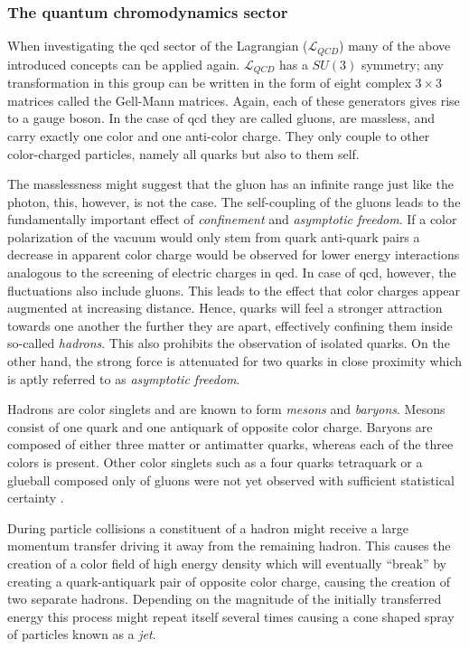 \subsubsection{The quantum chromodynamics sector}
\label{sec:qcd}

When investigating the \gls{qcd} sector of the Lagrangian ($\mathcal{L}_{QCD}$) many of the above introduced concepts can be applied again. $\mathcal{L}_{QCD}$ has a $SU(3)$ symmetry; any transformation in this group can be written in the form of eight complex $3\times 3$ matrices called the Gell-Mann matrices. Again, each of these generators gives rise to a gauge boson. In the case of \gls{qcd} they are called gluons, are massless, and carry exactly one color and one anti-color charge. They only couple to other color-charged particles, namely all quarks but also to them self. 

The masslessness might suggest that the gluon has an infinite range just like the photon, this, however, is not the case. The self-coupling of the gluons leads to the fundamentally important effect of \emph{confinement} and \emph{asymptotic freedom}. If a color polarization of the vacuum would only stem from quark anti-quark pairs a decrease in apparent color charge would be observed for lower energy interactions analogous to the screening of electric charges in \gls{qed}. In case of \gls{qcd}, however, the fluctuations also include gluons. This leads to the effect that color charges appear augmented at increasing distance. Hence, quarks will feel a stronger attraction towards one another the further they are apart, effectively confining them inside so-called \emph{hadrons}. This also prohibits the observation of isolated quarks. On the other hand, the strong force is attenuated for two quarks in close proximity which is aptly referred to as \emph{asymptotic freedom}.

Hadrons are color singlets and are known to form \emph{mesons} and \emph{baryons}. Mesons consist of one quark and one antiquark of opposite color charge. Baryons are composed of either three matter or antimatter quarks, whereas each of the three colors is present. Other color singlets such as a four quarks tetraquark or a glueball composed only of gluons were not yet observed with sufficient statistical certainty \cite{Ali2010,Cotugno2010}. 

During particle collisions a constituent of a hadron might receive a large momentum transfer driving it away from the remaining hadron. This causes the creation of a color field of high energy density which will eventually ``break'' by creating a quark-antiquark pair of opposite color charge, causing the creation of two separate hadrons. Depending on the magnitude of the initially transferred energy this process might repeat itself several times causing a cone shaped spray of particles known as a \emph{jet}.

